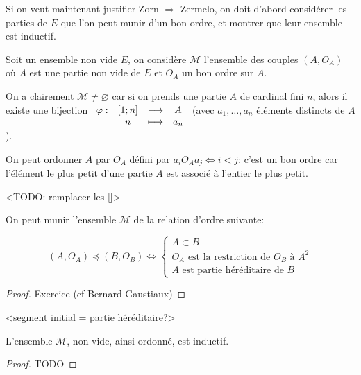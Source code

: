 Si on veut maintenant justifier Zorn $\Longrightarrow$ Zermelo, on doit d'abord considérer les parties de $E$ que l'on peut munir d'un bon ordre, et montrer que leur ensemble est inductif.

\begin{proposition}{}{}
    Soit un ensemble non vide $E$, on considère $\mathcal{M}$ l'ensemble des couples $(A,O_A)$ où $A$ est une partie non vide de $E$ et $O_A$ un bon ordre sur $A$.
\end{proposition}

\begin{remark}{}{}
    On a clairement $\mathcal{M} \neq \varnothing$ car si on prends une partie $A$ de cardinal fini $n$, 
    alors il existe une bijection $\begin{array}[t]{cccc}\varphi : & [1;n] & \longrightarrow & A \\ & n & \longmapsto & a_n\end{array}$ (avec $a_1, \dots, a_n$ éléments distincts de $A$).

    On peut ordonner $A$ par $O_A$ défini par $a_i O_A a_j \Longleftrightarrow i < j$: c'est un bon ordre car l'élément le plus petit d'une partie $A$ est associé à l'entier le plus petit.
\end{remark}
<TODO: remplacer les []>

\begin{proposition}{}{}
    On peut munir l'ensemble $\mathcal{M}$ de la relation d'ordre suivante:

    \[ (A, O_A) \preccurlyeq (B, O_B) \Leftrightarrow \left\{
        \begin{array}{ll}
            A \subset B \\
            O_A \text{ est la restriction de } O_B \text{ à } A^2 \\
            A \text{ est partie héréditaire de } B
        \end{array}
    \right. \]

\end{proposition}

\begin{proof}
    Exercice (cf Bernard Gaustiaux)
\end{proof}

<segment initial = partie héréditaire?>

\begin{proposition}{}{}
    L'ensemble $\mathcal{M}$, non vide, ainsi ordonné, est inductif.
\end{proposition}

\begin{proof}
    TODO
\end{proof}


